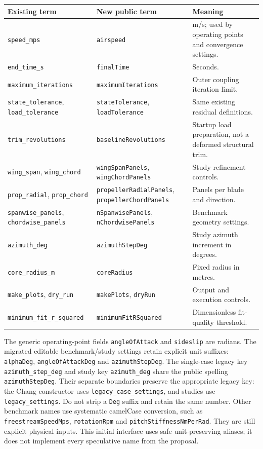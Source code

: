 \documentclass[11pt,a4paper]{article}
\newcommand{\code}{\nolinkurl}
\begin{document}
\begin{longtable}{@{}L{.30\linewidth}L{.29\linewidth}L{.33\linewidth}@{}}
\toprule Existing term & New public term & Meaning\\\midrule\endhead
\code{speed_mps} & \code{airspeed} & m/s; used by operating points and convergence settings.\\
\code{end_time_s} & \code{finalTime} & Seconds.\\
\code{maximum_iterations} & \code{maximumIterations} & Outer coupling iteration limit.\\
\code{state_tolerance}, \code{load_tolerance} & \code{stateTolerance}, \code{loadTolerance} & Same existing residual definitions.\\
\code{trim_revolutions} & \code{baselineRevolutions} & Startup load preparation, not a deformed structural trim.\\
\code{wing_span}, \code{wing_chord} & \code{wingSpanPanels}, \code{wingChordPanels} & Study refinement controls.\\
\code{prop_radial}, \code{prop_chord} & \code{propellerRadialPanels}, \code{propellerChordPanels} & Panels per blade and direction.\\
\code{spanwise_panels}, \code{chordwise_panels} & \code{nSpanwisePanels}, \code{nChordwisePanels} & Benchmark geometry settings.\\
\code{azimuth_deg} & \code{azimuthStepDeg} & Study azimuth increment in degrees.\\
\code{core_radius_m} & \code{coreRadius} & Fixed radius in metres.\\
\code{make_plots}, \code{dry_run} & \code{makePlots}, \code{dryRun} & Output and execution controls.\\
\code{minimum_fit_r_squared} & \code{minimumFitRSquared} & Dimensionless fit-quality threshold.\\
\bottomrule
\end{longtable}

The generic operating-point fields \code{angleOfAttack} and \code{sideslip}
are radians. The migrated editable benchmark/study settings retain explicit
unit suffixes: \code{alphaDeg}, \code{angleOfAttackDeg} and \code{azimuthStepDeg}.
The single-case legacy key \code{azimuth_step_deg} and study key
\code{azimuth_deg} share the public spelling \code{azimuthStepDeg}.
Their separate boundaries preserve the appropriate legacy key: the Chang
constructor uses \code{legacy_case_settings}, and studies use \code{legacy_settings}.
Do not strip a \code{Deg} suffix and retain the same number. Other benchmark
names use systematic camelCase conversion, such as \code{freestreamSpeedMps},
\code{rotationRpm} and \code{pitchStiffnessNmPerRad}. They are still explicit
physical inputs. This initial interface uses safe unit-preserving aliases;
it does not implement every speculative name from the proposal.
\end{document}
